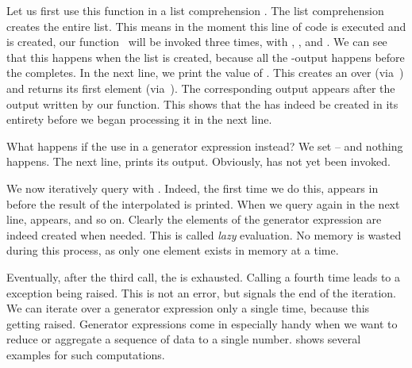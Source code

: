 Let us first use this function in a list comprehension .
The list comprehension creates the entire list.
This means in the moment this line of code is executed and  is created, our function~ will be invoked three times, with , , and .
We can see that this happens when the list is created, because all the -output happens before the  completes.
In the next line, we print the value of .
This creates an  over  (via~) and returns its first element (via~).
The corresponding output appears after the output written by our  function.
This shows that the  has indeed be created in its entirety before we began processing it in the next line.%
%
\begin{sloppypar}%
What happens if the use  in a generator expression instead?
We set  -- and nothing happens.
The next line,  prints its output.
Obviously,  has not yet been invoked.%
\end{sloppypar}%
%
We now iteratively query  with .
Indeed, the first time we do this,  appears in  before the result of the interpolated   is printed.
When we query  again in the next line,  appears, and so on.
Clearly the elements of the generator expression are indeed created when needed.
This is called \emph{lazy} evaluation.
No memory is wasted during this process, as only one element exists in memory at a time.

Eventually, after the third  call, the  is exhausted.
Calling  a fourth time leads to a  exception being raised.
This is not an error, but signals the end of the iteration.
We can iterate over a generator expression only a single time, because this  getting raised.%
%
%
%
%
%
%
Generator expressions come in especially handy when we want to reduce or aggregate a sequence of data to a single number.
 shows several examples for such computations.

